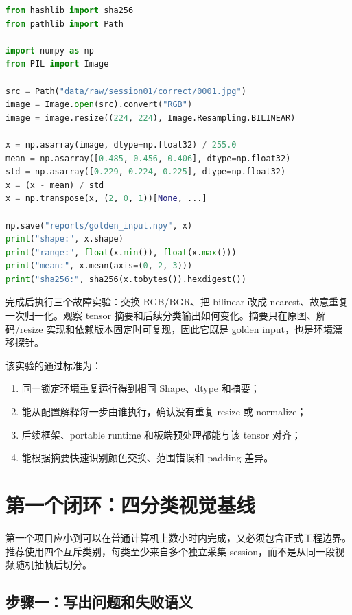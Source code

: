 \begin{lstlisting}[language=Python,caption={生成可重复检查的分类输入 tensor}]
from hashlib import sha256
from pathlib import Path

import numpy as np
from PIL import Image

src = Path("data/raw/session01/correct/0001.jpg")
image = Image.open(src).convert("RGB")
image = image.resize((224, 224), Image.Resampling.BILINEAR)

x = np.asarray(image, dtype=np.float32) / 255.0
mean = np.asarray([0.485, 0.456, 0.406], dtype=np.float32)
std = np.asarray([0.229, 0.224, 0.225], dtype=np.float32)
x = (x - mean) / std
x = np.transpose(x, (2, 0, 1))[None, ...]

np.save("reports/golden_input.npy", x)
print("shape:", x.shape)
print("range:", float(x.min()), float(x.max()))
print("mean:", x.mean(axis=(0, 2, 3)))
print("sha256:", sha256(x.tobytes()).hexdigest())
\end{lstlisting}

完成后执行三个故障实验：交换 RGB/BGR、把 bilinear 改成 nearest、故意重复一次归一化。观察 tensor 摘要和后续分类输出如何变化。摘要只在原图、解码/resize 实现和依赖版本固定时可复现，因此它既是 golden input，也是环境漂移探针。

该实验的通过标准为：

\begin{enumerate}
  \item 同一锁定环境重复运行得到相同 Shape、dtype 和摘要；
  \item 能从配置解释每一步由谁执行，确认没有重复 resize 或 normalize；
  \item 后续框架、portable runtime 和板端预处理都能与该 tensor 对齐；
  \item 能根据摘要快速识别颜色交换、范围错误和 padding 差异。
\end{enumerate}

\section{第一个闭环：四分类视觉基线}

第一个项目应小到可以在普通计算机上数小时内完成，又必须包含正式工程边界。推荐使用四个互斥类别，每类至少来自多个独立采集 session，而不是从同一段视频随机抽帧后切分。

\subsection{步骤一：写出问题和失败语义}


